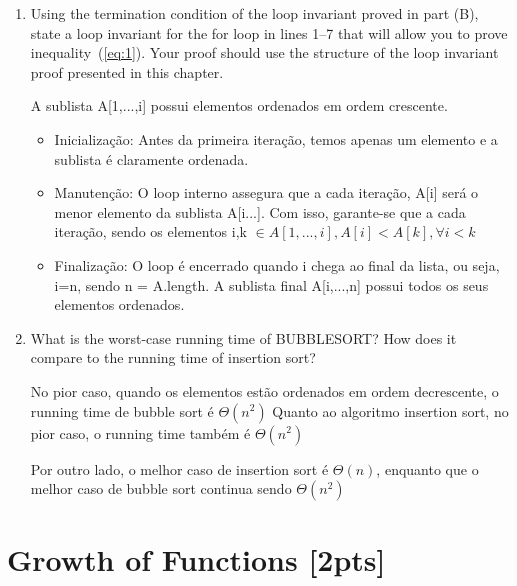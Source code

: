 \documentclass{article}
\begin{document}
\begin{enumerate}[label=\Alph*]
		\item Using the termination condition of the loop invariant proved in part (B), state a loop invariant for the for loop in lines 1–7 that will allow you to prove inequality~(\ref{eq:1}). Your proof should use the structure of the loop invariant proof presented in this chapter.
		
		A sublista A[1,...,i] possui elementos ordenados em ordem crescente.
		
		\begin{itemize}
			\item Inicialização: Antes da primeira iteração, temos apenas um elemento e a sublista é claramente ordenada.
			
			\item Manutenção: O loop interno assegura que a cada iteração, A[i] será o menor elemento da sublista A[i...]. Com isso, garante-se que a cada iteração, sendo os elementos i,k $\in A[1,...,i], A[i]<A[k], \forall i<k$
			
			\item Finalização: O loop é encerrado quando i chega ao final da lista, ou seja, i=n, sendo n = A.length. A sublista final A[i,...,n] possui todos os seus elementos ordenados.
		\end{itemize}
		
		\item What is the worst-case running time of BUBBLESORT? How does it compare to the running time of insertion sort?
		
		No pior caso, quando os elementos estão ordenados em ordem decrescente, o running time de bubble sort é $\Theta (n^2)$
		Quanto ao algoritmo insertion sort, no pior caso, o running time também é $\Theta(n^2)$
		
		Por outro lado, o melhor caso de insertion sort é $\Theta(n)$, enquanto que o melhor caso de bubble sort continua sendo $\Theta(n^2)$
		
	\end{enumerate}
	
	
	\section{Growth of Functions [2pts]}
	
\end{document}
